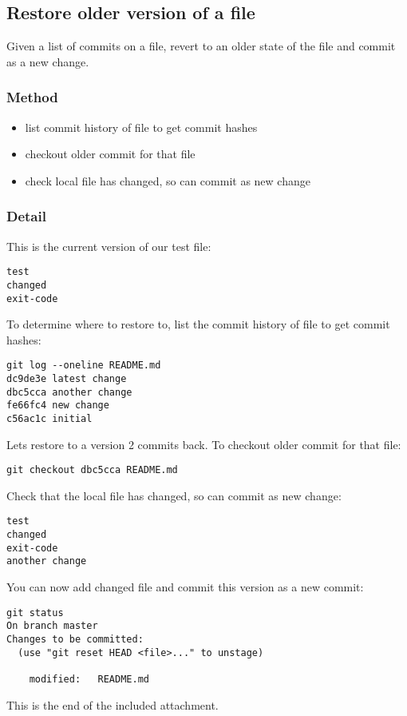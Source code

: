
% 

\subsection*{Restore older version of a file}

\noindent Given a list of commits on a file, revert to an older state of the file and
commit as a new change.

\subsubsection*{Method}

\begin{itemize}
\item list commit history of file to get commit hashes
\item checkout older commit for that file
\item  check local file has changed, so can commit as new change
\end{itemize}

\subsubsection*{Detail}

\noindent This is the current version of our test file:
\begin{lstlisting}[language=ksh,caption={Test file: README.md}]
test
changed
exit-code
\end{lstlisting}

\noindent To determine where to restore to, list the commit history of file to get commit
hashes:
\begin{lstlisting}[language=ksh]
git log --oneline README.md
dc9de3e latest change
dbc5cca another change
fe66fc4 new change
c56ac1c initial
\end{lstlisting}

\noindent Lets restore to a version 2 commits back. To checkout older commit for that
file:
\begin{lstlisting}[language=ksh]
git checkout dbc5cca README.md
\end{lstlisting}

\noindent Check that the local file has changed, so can commit as new change:
\begin{lstlisting}[language=ksh,caption={Changed file: README.md}]
test
changed
exit-code
another change
\end{lstlisting}

\noindent You can now add changed file and commit this version as a new commit:
\begin{lstlisting}[language=ksh]
git status
On branch master
Changes to be committed:
  (use "git reset HEAD <file>..." to unstage)

	modified:   README.md
\end{lstlisting}

This is the end of the included attachment.

% 
